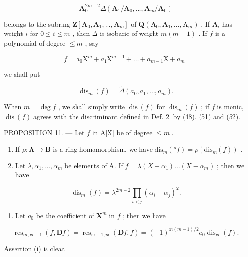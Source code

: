 \[
\mathbf {A} _ {0} ^ {2 m - 2} \Delta (\mathbf {A} _ {1} / \mathbf {A} _ {0}, \dots , \mathbf {A} _ {m} / \mathbf {A} _ {0})
\]

belongs to the subring \(\mathbf{Z}[\mathbf{A}_0, \mathbf{A}_1, \ldots, \mathbf{A}_m]\) of \(\mathbf{Q}(\mathbf{A}_0, \mathbf{A}_1, \ldots, \mathbf{A}_m)\) . If \(\mathbf{A}_i\) has weight \(i\) for \(0 \leqslant i \leqslant m\) , then \(\tilde{\Delta}\) is isobaric of weight \(m(m - 1)\) . If \(f\) is a polynomial of degree \(\leqslant m\) , say

\[
f = a _ {0} \mathrm{X} ^ {m} + a _ {1} \mathrm{X} ^ {m - 1} + \dots + a _ {m - 1} \mathrm{X} + a _ {m},
\]

we shall put

\[
\operatorname{dis} _ {m} (f) = \tilde {\Delta} \left(a _ {0}, a _ {1}, \dots , a _ {m}\right).\tag{52}
\]

When \(m = \deg f\) , we shall simply write \(\operatorname{dis}(f)\) for \(\operatorname{dis}_m(f)\) ; if \(f\) is monic, \(\operatorname{dis}(f)\) agrees with the discriminant defined in Def. 2, by (48), (51) and (52).

PROPOSITION 11. --- Let \(f\) in A{[}X{]} be of degree \(\leqslant m\) .

\begin{enumerate}
\def\labelenumi{(\roman{enumi})}
\item
  If \(\rho: \mathbf{A} \to \mathbf{B}\) is a ring homomorphism, we have \(\mathrm{dis}_m({}^{\rho}f) = \rho(\mathrm{dis}_m(f))\) .
\item
  Let \(\lambda, \alpha_{1}, \ldots, \alpha_{m}\) be elements of A. If \(f = \lambda(X - \alpha_{1}) \ldots (X - \alpha_{m})\) ; then we have
\end{enumerate}

\[
\operatorname{dis} _ {m} (f) = \lambda^ {2 m - 2} \prod_ {i <   j} (\alpha_ {i} - \alpha_ {j}) ^ {2}.\tag{53}
\]

\begin{enumerate}
\def\labelenumi{(\roman{enumi})}
\setcounter{enumi}{2}
\tightlist
\item
  Let \(a_0\) be the coefficient of \(\mathbf{X}^m\) in \(f\) ; then we have
\end{enumerate}

\[
\operatorname{res} _ {m, m - 1} (f, \mathbf {D} f) = \operatorname{res} _ {m - 1, m} (\mathbf {D} f, f) = (- 1) ^ {m (m - 1) / 2} a _ {0} \operatorname{dis} _ {m} (f).\tag{54}
\]

Assertion (i) is clear.

